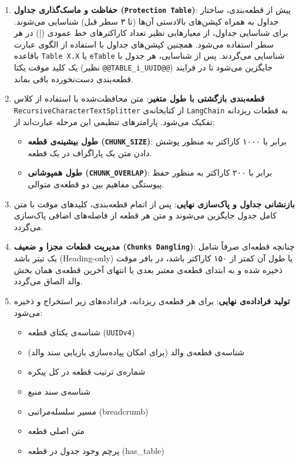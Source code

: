 \begin{enumerate}
	\item \textbf{حفاظت و ماسک‌گذاری جداول (\texttt{Protection Table})}: پیش از قطعه‌بندی، ساختار جداول به همراه کپشن‌های بالادستی آن‌ها (تا ۳ سطر قبل) شناسایی می‌شوند. برای شناسایی جداول، از معیارهایی نظیر تعداد کاراکترهای خط عمودی (|) در هر سطر استفاده می‌شود. همچنین کپشن‌های جداول با استفاده از الگوی عبارت باقاعده \texttt{Table X.X} یا \texttt{eTable} شناسایی می‌گردند. پس از شناسایی، هر جدول با یک کلید موقت یکتا (نظیر \texttt{@@TABLE\_i\_UUID@@}) جایگزین می‌شود تا در فرایند قطعه‌بندی دست‌نخورده باقی بماند.
	
	\item \textbf{قطعه‌بندی بازگشتی با طول متغیر}: متن محافظت‌شده با استفاده از کلاس 
	\texttt{RecursiveCharacterTextSplitter} از کتابخانه‌ی \texttt{LangChain} به قطعات ریزدانه تفکیک می‌شود. پارامترهای تنظیمی این مرحله عبارت‌اند از:
	\begin{itemize}
		\item \textbf{طول بیشینه‌ی قطعه (\texttt{CHUNK\_SIZE})}: برابر با ۱۰۰۰ کاراکتر به منظور پوشش دادن متن یک پاراگراف در یک قطعه.
		\item \textbf{طول همپوشانی (\texttt{CHUNK\_OVERLAP})}: برابر با ۲۰۰ کاراکتر به منظور حفظ پیوستگی مفاهیم بین دو قطعه‌ی متوالی.
	\end{itemize}
	
	\item \textbf{بازنشانی جداول و پاک‌سازی نهایی}: پس از اتمام قطعه‌بندی، کلیدهای موقت با متن کامل جدول جایگزین می‌شوند و متن هر قطعه از فاصله‌های اضافی پاک‌سازی می‌گردد.
	
	\item \textbf{مدیریت قطعات مجزا و ضعیف (\texttt{Chunks Dangling})}: چنانچه قطعه‌ای صرفاً شامل یک تیتر باشد (Heading-only) یا طول آن کمتر از ۱۵۰ کاراکتر باشد، در بافر موقت ذخیره شده و به ابتدای قطعه‌ی معتبر بعدی یا انتهای آخرین قطعه‌ی همان بخش والد الصاق می‌گردد.
	
	\item \textbf{تولید فراداده‌ی نهایی}: برای هر قطعه‌ی ریزدانه، فراداده‌های زیر استخراج و ذخیره می‌شود:
	\begin{itemize}
		\item شناسه‌ی یکتای قطعه (\texttt{UUIDv4})
		\item شناسه‌ی قطعه‌ی والد (برای امکان پیاده‌سازی بازیابی سند والد)
		\item شماره‌ی ترتیب قطعه در کل پیکره
		\item شناسه‌ی سند منبع
		\item مسیر سلسله‌مراتبی (breadcrumb)
		\item متن اصلی قطعه
		\item پرچم وجود جدول در قطعه (has\_table)
	\end{itemize}
\end{enumerate}


